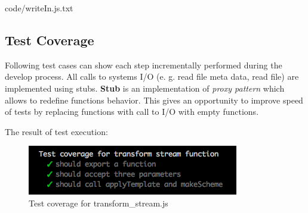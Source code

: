 
{code/writeIn.js.txt}

\subsection{Test Coverage}
Following test cases can show each step incrementally performed during the develop process. All calls to systems I/O (e. g. read file meta data, read file) are implemented using stubs. \textbf{Stub} is an implementation of \textit{proxy pattern} which allows to redefine functions behavior. This gives an opportunity to improve speed of tests by replacing functions with call to I/O with empty functions.
%

The result of test execution:
\begin{figure}[H]
	\centering
	\includegraphics[width=\linewidth]{grafiken/testTransform.png}
	\caption{Test coverage for transform\_stream.js}
	\label{fig:testTransofm}
\end{figure}

